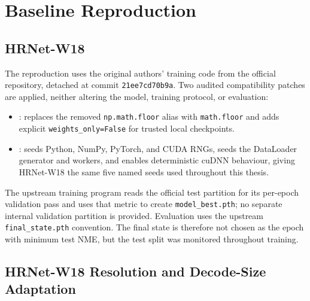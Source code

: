 
\section{Baseline Reproduction}
\label{app:baseline-reproduction}


\subsection{HRNet-W18}
\label{app:hrnet-reproduction}

The reproduction uses the original authors' training code from the
official 
repository, detached at commit \texttt{21ee7cd70b9a}. Two audited
compatibility patches are applied, neither altering the model,
training protocol, or evaluation:

\begin{itemize}

  \item {}: replaces the removed
    \texttt{np.math.floor} alias with \texttt{math.floor} and adds
    explicit \texttt{weights\_only=False} for trusted local
    checkpoints.

  \item {}: seeds Python,
    NumPy, PyTorch, and CUDA RNGs, seeds the DataLoader generator
    and workers, and enables deterministic cuDNN behaviour, giving
    HRNet-W18 the same five named seeds used throughout this thesis.

\end{itemize}

The upstream training program reads the official test partition for
its per-epoch validation pass and uses that metric to create
\texttt{model\_best.pth}; no separate internal validation partition
is provided. Evaluation uses the upstream \texttt{final\_state.pth}
convention. The final state is therefore not chosen as the epoch with
minimum test NME, but the test split was monitored throughout
training.


\subsection{HRNet-W18 Resolution and Decode-Size Adaptation}
\label{app:hrnet-512-fix}

